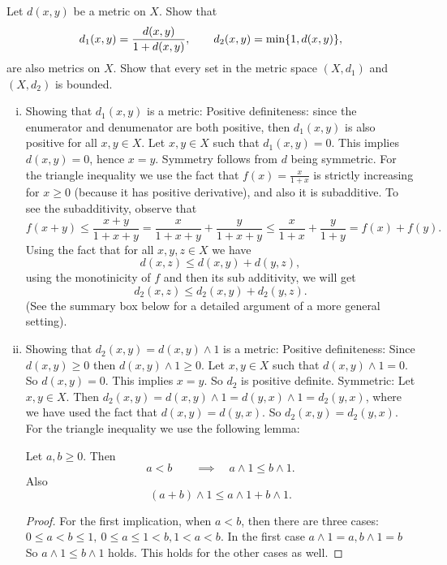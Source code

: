 \begin{problem}
	Let $ d(x,y) $ be a metric on $ X $. Show that 
	\[ d_1(x,y) = \frac{d(x,y)}{1+d(x,y)}, \qquad d_2(x,y) = \min\{1,d(x,y)\}, \]
	are also metrics on $ X $. Show that every set in the metric space $ (X,d_1) $ and $ (X,d_2) $ is bounded.
\end{problem}
\begin{solution}
	\begin{enumerate}[(i)]
		\item Showing that $ d_1(x,y) $ is a metric: Positive definiteness: since the enumerator and denumenator are both positive, then $ d_1(x,y) $ is also positive for all $ x,y\in X $. Let $ x,y\in X $ such that $ d_1(x,y) =0 $. This implies $ d(x,y) =0 $, hence $ x=y $. Symmetry follows from $ d $ being symmetric. For the triangle inequality we use the fact that $ f(x) = \frac{x}{1+x} $ is strictly increasing for $ x\geq 0 $ (because it has positive derivative), and also it is subadditive. To see the subadditivity, observe that
		\[ f(x+y) \leq \frac{x+y}{1+x+y} = \frac{x}{1+x+y} + \frac{y}{1+x+y} \leq \frac{x}{1+x} + \frac{y}{1+y} = f(x) + f(y).  \]
		Using the fact that for all $ x,y,z\in X $ we have
		\[ d(x,z) \leq d(x,y) + d(y,z), \]
		using the monotinicity of $ f $ and then its sub additivity, we will get
		\[ d_2(x,z) \leq d_2(x,y) + d_2(y,z). \]
		(See the summary box below for a detailed argument of a more general setting).
		
		\item Showing that $ d_2(x,y) = d(x,y)\wedge 1 $ is a metric: Positive definiteness: Since $ d(x,y) \geq 0 $ then $ d(x,y)\wedge 1 \geq 0 $. Let $ x,y \in X $ such that $ d(x,y) \wedge 1 = 0 $. So $ d(x,y) = 0 $. This implies $ x=y $. So $ d_2 $ is positive definite. Symmetric: Let $ x,y\in X $. Then $ d_2(x,y) = d(x,y)\wedge 1 = d(y,x)\wedge 1 = d_2(y,x) $, where we have used the fact that $ d(x,y) = d(y,x) $. So $ d_2(x,y) = d_2(y,x) $. For the triangle inequality we use the following lemma:
		\begin{lemma}
			Let $ a,b \geq 0 $. Then 
			\[ a < b \qquad \implies \quad a\wedge 1 \leq b \wedge 1. \]
			Also
			\[ (a+b) \wedge 1 \leq a\wedge 1 + b\wedge 1. \]
			
			\begin{proof}
				For the first implication, when $ a<b $, then there are three cases: $ 0\leq a < b \leq 1,\ 0\leq a \leq 1 < b, 1 < a<b $. In the first case $ a\wedge 1 = a, b\wedge 1 = b $ So $ a\wedge 1 \leq b\wedge 1 $ holds. This holds for the other cases as well.
				

\end{proof}
\end{lemma}
\end{enumerate}
\end{solution}
